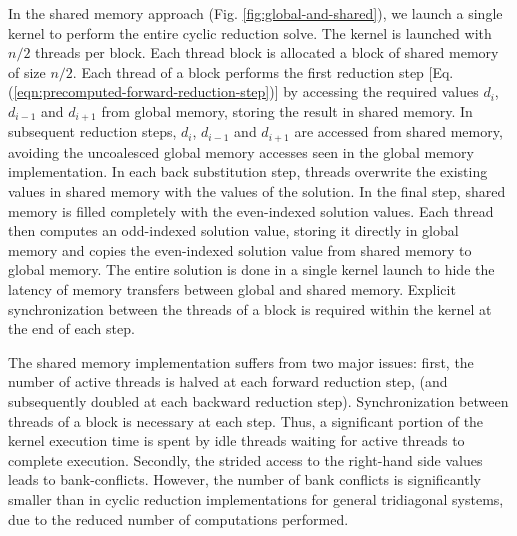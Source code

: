 In the shared memory approach (Fig. \ref{fig:global-and-shared}),
we launch a single kernel to perform the entire
cyclic reduction solve.
The kernel is launched with $n/2$ threads per block.
Each thread block is allocated a block of shared memory of size $n/2$.
Each thread of a block performs the first reduction step
[Eq. (\ref{eqn:precomputed-forward-reduction-step})]
by accessing the required values
$d_i$, $d_{i-1}$ and $d_{i+1}$ from global memory,
storing the result in shared memory.
In subsequent reduction steps,
$d_i$, $d_{i-1}$ and $d_{i+1}$
are accessed from shared memory,
avoiding the uncoalesced global memory accesses
seen in the global memory implementation.
In each back substitution step,
threads overwrite the existing values in shared memory
with the values of the solution.
In the final step,
shared memory is filled completely
with the even-indexed solution values.
Each thread then computes an odd-indexed solution value,
storing it directly in global memory
and copies the even-indexed solution value
from shared memory to global memory.
The entire solution is done in a single kernel launch
to hide the latency of
memory transfers between global and shared memory.
Explicit synchronization between the threads of a block
is required within the kernel at the end of each step.

The shared memory implementation suffers from two major issues:
first, the number of active threads is halved at each forward reduction step,
(and subsequently doubled at each backward reduction step).
Synchronization between threads of a block is necessary at each step.
Thus, a significant portion of the kernel execution time is
spent by idle threads waiting for active threads to complete execution.
Secondly, the strided access to the
right-hand side values leads to bank-conflicts.
However, the number of bank conflicts is significantly smaller
than in cyclic reduction implementations for general tridiagonal systems,
due to the reduced number of computations performed.
